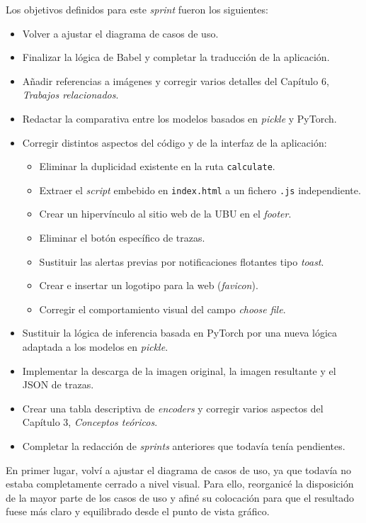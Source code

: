 Los objetivos definidos para este \textit{sprint} fueron los siguientes:
\begin{itemize}
	\item Volver a ajustar el diagrama de casos de uso.
	\item Finalizar la lógica de Babel y completar la traducción de la aplicación.
	\item Añadir referencias a imágenes y corregir varios detalles del Capítulo 6, \textit{Trabajos relacionados}.
	\item Redactar la comparativa entre los modelos basados en \textit{pickle} y PyTorch.
	\item Corregir distintos aspectos del código y de la interfaz de la aplicación:
	\begin{itemize}
		\item Eliminar la duplicidad existente en la ruta \texttt{calculate}.
		\item Extraer el \textit{script} embebido en \texttt{index.html} a un fichero \texttt{.js} independiente.
		\item Crear un hipervínculo al sitio web de la UBU en el \textit{footer}.
		\item Eliminar el botón específico de trazas.
		\item Sustituir las alertas previas por notificaciones flotantes tipo \textit{toast}.
		\item Crear e insertar un logotipo para la web (\textit{favicon}).
		\item Corregir el comportamiento visual del campo \textit{choose file}.
	\end{itemize}
	\item Sustituir la lógica de inferencia basada en PyTorch por una nueva lógica adaptada a los modelos en \textit{pickle}.
	\item Implementar la descarga de la imagen original, la imagen resultante y el JSON de trazas.
	\item Crear una tabla descriptiva de \textit{encoders} y corregir varios aspectos del Capítulo 3, \textit{Conceptos teóricos}.
	\item Completar la redacción de \textit{sprints} anteriores que todavía tenía pendientes.
\end{itemize}

En primer lugar, volví a ajustar el diagrama de casos de uso, ya que todavía no estaba completamente cerrado a nivel visual. Para ello, reorganicé la disposición de la mayor parte de los casos de uso y afiné su colocación para que el resultado fuese más claro y equilibrado desde el punto de vista gráfico.

